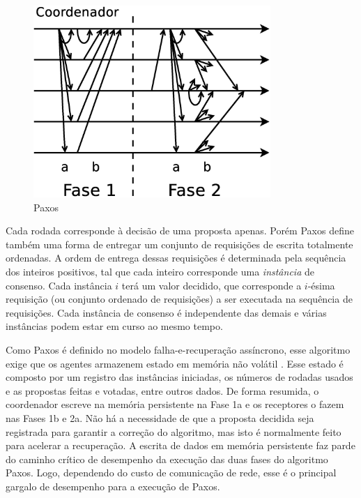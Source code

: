 \begin{figure}[htbp]
  \centering
  \includegraphics[width=9cm]{conteudo/capitulos/figuras/paxos.dia.eps}
  \caption{Paxos}
  \label{fig:fases-paxos}
\end{figure}

Cada rodada corresponde à decisão de uma proposta apenas. Porém Paxos define também uma
forma de entregar um conjunto de requisições de escrita totalmente ordenadas. A ordem de
entrega dessas requisições é determinada pela sequência dos inteiros positivos, tal que
cada inteiro corresponde uma \emph{instância} de consenso. Cada instância $i$ terá um
valor decidido, que corresponde a $i$-ésima requisição (ou conjunto ordenado de
requisições) a ser executada na sequência de requisições. Cada instância de consenso é
independente das demais e várias instâncias podem estar em curso ao mesmo tempo.

Como Paxos é definido no modelo falha-e-recuperação assíncrono, esse algoritmo exige que
os agentes armazenem estado em memória não volátil \cite{lamport06a}. Esse estado é
composto por um registro das instâncias iniciadas, os números de rodadas usados e as
propostas feitas e votadas, entre outros dados. De forma resumida, o coordenador escreve
na memória persistente na Fase 1a e os receptores o fazem nas Fases 1b e 2a. Não há a
necessidade de que a proposta decidida seja registrada para garantir a correção do
algoritmo, mas isto é normalmente feito para acelerar a recuperação. A escrita de dados em
memória persistente faz parde do caminho crítico de desempenho da execução das duas fases
do algoritmo Paxos. Logo, dependendo do custo de comunicação de rede, esse é o principal
gargalo de desempenho para a execução de Paxos.

